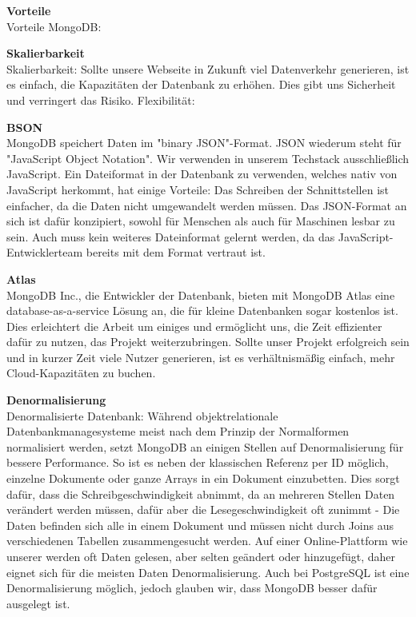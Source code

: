 \textbf{Vorteile}\\
Vorteile MongoDB: 

\textbf{Skalierbarkeit}\\
Skalierbarkeit: Sollte unsere Webseite in Zukunft viel Datenverkehr generieren, ist es einfach, die Kapazitäten der Datenbank zu erhöhen. Dies gibt uns Sicherheit und verringert das Risiko.
Flexibilität:

\textbf{BSON}\\
MongoDB speichert Daten im "binary JSON"-Format. JSON wiederum steht für "JavaScript Object Notation". Wir verwenden in unserem Techstack ausschließlich JavaScript. Ein Dateiformat in der Datenbank zu verwenden, welches nativ von JavaScript herkommt, hat einige Vorteile: Das Schreiben der Schnittstellen ist einfacher, da die Daten nicht umgewandelt werden müssen. Das JSON-Format an sich ist dafür konzipiert, sowohl für Menschen als auch für Maschinen lesbar zu sein. Auch muss kein weiteres Dateinformat gelernt werden, da das JavaScript-Entwicklerteam bereits mit dem Format vertraut ist.

\textbf{Atlas}\\
MongoDB Inc., die Entwickler der Datenbank, bieten mit MongoDB Atlas eine database-as-a-service Lösung an, die für kleine Datenbanken sogar kostenlos ist. Dies erleichtert die Arbeit um einiges und ermöglicht uns, die Zeit effizienter dafür zu nutzen, das Projekt weiterzubringen. Sollte unser Projekt erfolgreich sein und in kurzer Zeit viele Nutzer generieren, ist es verhältnismäßig einfach, mehr Cloud-Kapazitäten zu buchen.

\textbf{Denormalisierung}\\
Denormalisierte Datenbank: Während objektrelationale Datenbankmanagesysteme meist nach dem Prinzip der Normalformen normalisiert werden, setzt MongoDB an einigen Stellen auf Denormalisierung für bessere Performance. So ist es neben der klassischen Referenz per ID möglich, einzelne Dokumente oder ganze Arrays in ein Dokument einzubetten. Dies sorgt dafür, dass die Schreibgeschwindigkeit abnimmt, da an mehreren Stellen Daten verändert werden müssen, dafür aber die Lesegeschwindigkeit oft zunimmt - Die Daten befinden sich alle in einem Dokument und müssen nicht durch Joins aus verschiedenen Tabellen zusammengesucht werden.
Auf einer Online-Plattform wie unserer werden oft Daten gelesen, aber selten geändert oder hinzugefügt, daher eignet sich für die meisten Daten Denormalisierung.
Auch bei PostgreSQL ist eine Denormalisierung möglich, jedoch glauben wir, dass MongoDB besser dafür ausgelegt ist.


